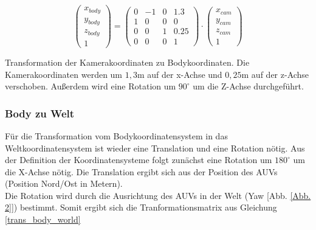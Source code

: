\begin{ownequation}[H]
\begin{equation}
\begin{pmatrix}
x_{body}\\y_{body}\\z_{body}\\1
\end{pmatrix}
=
\begin{pmatrix}
0 & -1 & 0& 1.3\\
1 & 0 & 0& 0\\
0 & 0 & 1& 0.25\\
0 & 0 & 0 & 1
\end{pmatrix}
\cdot
\begin{pmatrix}
x_{cam}\\y_{cam}\\z_{cam}\\1
\end{pmatrix}
\end{equation}
\caption[Transformation der Kamerakoordinaten zu Bodykoordinaten]{Transformation der Kamerakoordinaten zu Bodykoordinaten. Die Kamerakoordinaten werden um $1,3$m auf der x-Achse und $0,25$m auf der z-Achse verschoben. Außerdem wird eine Rotation um $90^\circ$ um die Z-Achse durchgeführt.}
\label{trans_cam_body}
\end{ownequation}

\subsubsection{Body zu Welt}
Für die Transformation vom Bodykoordinatensystem in das Weltkoordinatensystem ist wieder eine Translation und eine Rotation nötig.
Aus der Definition der Koordinatensysteme folgt zunächst eine Rotation um $180^\circ$ um die X-Achse nötig.
Die Translation ergibt sich aus der Position des AUVs (Position Nord/Ost in Metern).\\
Die Rotation wird durch die Ausrichtung des AUVs in der Welt (Yaw [Abb. \ref{Abb. 2}]) bestimmt. Somit ergibt sich die Tranformationsmatrix aus Gleichung \ref{trans_body_world}\\

